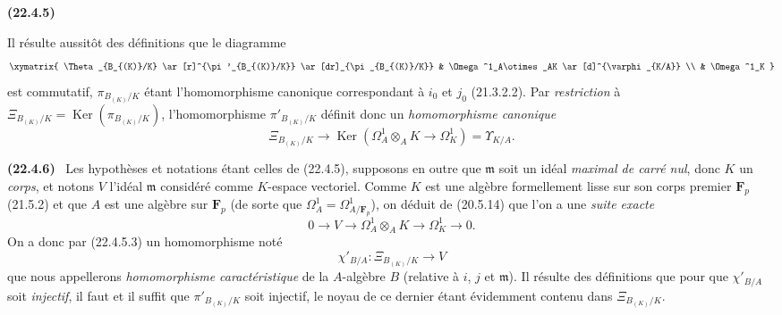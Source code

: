 \documentclass[10pt,oneside]{book}
\makeatletter
\newcommand{\setmanualcurrentlabel}[1]{\def\@currentlabel{#1}}
\newcommand{\oldpage}[2][]{%
  \setcounter{footnote}{0}%
  \marginpar{\scriptsize\textbf{#1}~|~#2}\ignorespaces}
\newenvironment{env}[1][]{\setmanualcurrentlabel{#1}\par\medskip\noindent\textbf{(#1)}\ }{\par}
\makeatother
\begin{document}
\begin{env}[22.4.5]
\oldpage[0\textsubscript{IV-1}]{198}

Il résulte aussitôt des définitions que le diagramme
\[
  \xymatrix{
    \Theta_{B_{(K)}/K} \ar[r]^{\pi'_{B_{(K)}/K}} \ar[dr]_{\pi_{B_{(K)}/K}}
      & \Omega^1_A\otimes_AK \ar[d]^{\varphi_{K/A}} \\
    & \Omega^1_K
  }
\]
est commutatif, $\pi_{B_{(K)}/K}$ étant l'homomorphisme canonique
correspondant à $i_0$ et $j_0$ (21.3.2.2). Par \emph{restriction} à
$\Xi_{B_{(K)}/K}=\operatorname{Ker}(\pi_{B_{(K)}/K})$, l'homomorphisme
$\pi'_{B_{(K)}/K}$ définit donc un \emph{homomorphisme canonique}
\begin{equation}
\label{0.22.4.5.3-fr}
  \Xi_{B_{(K)}/K}\longrightarrow
  \operatorname{Ker}(\Omega^1_A\otimes_AK\longrightarrow\Omega^1_K)=\Upsilon_{K/A}.
  \tag{22.4.5.3}
\end{equation}
\end{env}

\begin{env}[22.4.6]
\label{0.22.4.6-fr}
Les hypothèses et notations étant celles de (22.4.5), supposons en outre que
$\mathfrak m$ soit un idéal \emph{maximal de carré nul}, donc $K$ un
\emph{corps}, et notons $V$ l'idéal $\mathfrak m$ considéré comme $K$-espace
vectoriel. Comme $K$ est une algèbre formellement lisse sur son corps premier
$\mathbf F_p$ (21.5.2) et que $A$ est une algèbre sur $\mathbf F_p$ (de sorte
que $\Omega^1_A=\Omega^1_{A/\mathbf F_p}$), on déduit de (20.5.14) que l'on a
une \emph{suite exacte}
\begin{equation}
\label{0.22.4.6.1-fr}
  0\longrightarrow V\longrightarrow\Omega^1_A\otimes_AK
  \longrightarrow\Omega^1_K\longrightarrow0.
  \tag{22.4.6.1}
\end{equation}
On a donc par (22.4.5.3) un homomorphisme noté
\begin{equation}
\label{0.22.4.6.2-fr}
  \chi'_{B/A}:\Xi_{B_{(K)}/K}\longrightarrow V
  \tag{22.4.6.2}
\end{equation}
que nous appellerons \emph{homomorphisme caractéristique} de la $A$-algèbre
$B$ (relative à $i$, $j$ et $\mathfrak m$). Il résulte des définitions que pour
que $\chi'_{B/A}$ soit \emph{injectif}, il faut et il suffit que
$\pi'_{B_{(K)}/K}$ soit injectif, le noyau de ce dernier étant évidemment
contenu dans $\Xi_{B_{(K)}/K}$.
\end{env}
\end{document}
